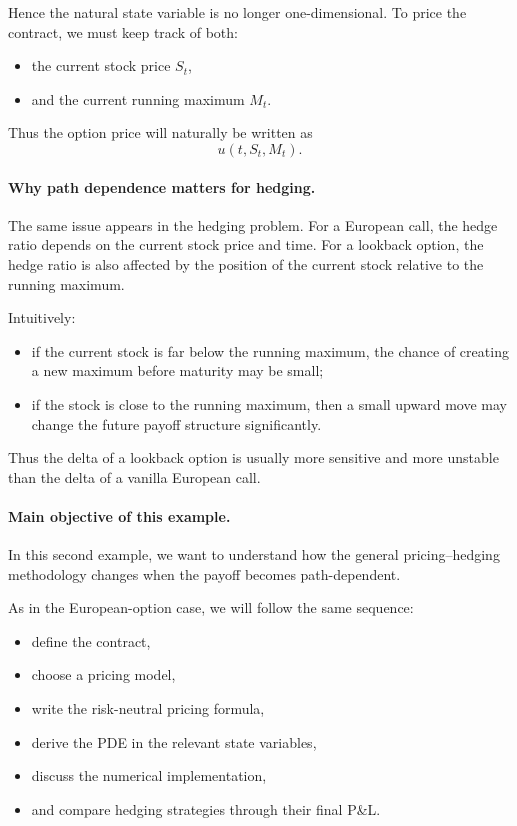 \documentclass[11pt]{article}
\theoremstyle{plain}
\theoremstyle{definition}
\theoremstyle{remark}
\begin{document}
Hence the natural state variable is no longer one-dimensional.
To price the contract, we must keep track of both:
\begin{itemize}[leftmargin=1.4em]
    \item the current stock price \(S_t\),
    \item and the current running maximum \(M_t\).
\end{itemize}

Thus the option price will naturally be written as
\[
u(t,S_t,M_t).
\]

\paragraph{Why path dependence matters for hedging.}
The same issue appears in the hedging problem.
For a European call, the hedge ratio depends on the current stock price
and time.
For a lookback option, the hedge ratio is also affected by the position
of the current stock relative to the running maximum.

Intuitively:
\begin{itemize}[leftmargin=1.4em]
    \item if the current stock is far below the running maximum, the
    chance of creating a new maximum before maturity may be small;
    \item if the stock is close to the running maximum, then a small
    upward move may change the future payoff structure significantly.
\end{itemize}

Thus the delta of a lookback option is usually more sensitive and more
unstable than the delta of a vanilla European call.

\paragraph{Main objective of this example.}
In this second example, we want to understand how the general
pricing--hedging methodology changes when the payoff becomes
path-dependent.

As in the European-option case, we will follow the same sequence:
\begin{itemize}[leftmargin=1.4em]
    \item define the contract,
    \item choose a pricing model,
    \item write the risk-neutral pricing formula,
    \item derive the PDE in the relevant state variables,
    \item discuss the numerical implementation,
    \item and compare hedging strategies through their final P\&L.
\end{itemize}
\end{document}
